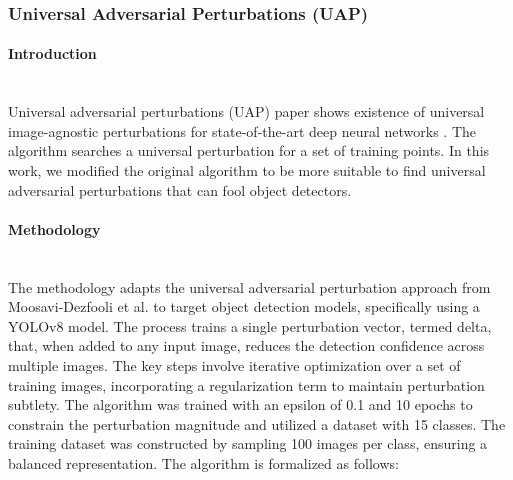 \documentclass[../main.tex]{subfiles}
\begin{document}
\subsubsection{Universal Adversarial Perturbations (UAP)}
\paragraph{Introduction}\leavevmode\\
Universal adversarial perturbations (UAP) paper shows existence of universal image-agnostic perturbations for state-of-the-art deep neural networks \cite{moosavi2017universal}. The algorithm searches a universal perturbation for a set of training points. In this work, we modified the original algorithm to be more suitable to find universal adversarial perturbations that can fool object detectors.

\paragraph{Methodology}\leavevmode\\
The methodology adapts the universal adversarial perturbation approach from Moosavi-Dezfooli et al. \cite{moosavi2017universal} to target object detection models, specifically using a YOLOv8 model. The process trains a single perturbation vector, termed delta, that, when added to any input image, reduces the detection confidence across multiple images. The key steps involve iterative optimization over a set of training images, incorporating a regularization term to maintain perturbation subtlety. The algorithm was trained with an epsilon of 0.1 and 10 epochs to constrain the perturbation magnitude and utilized a dataset with 15 classes. The training dataset was constructed by sampling 100 images per class, ensuring a balanced representation. The algorithm is formalized as follows:
\end{document}
